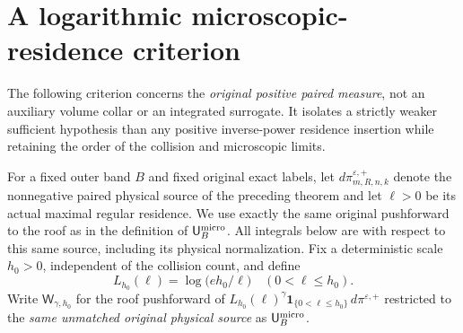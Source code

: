 \section{A logarithmic microscopic-residence criterion}
\label{sec:v106-logarithmic}
The following criterion concerns the \emph{original positive paired measure},
not an auxiliary volume collar or an integrated surrogate. It isolates a
strictly weaker sufficient hypothesis than any positive inverse-power
residence insertion while retaining the order of the collision and
microscopic limits.

For a fixed outer band $B$ and fixed original exact labels, let
$d\pi_{m,R,n,k}^{\varepsilon,+}$ denote the nonnegative paired
physical source of the preceding theorem and let $\ell>0$ be its
actual maximal regular residence. We use exactly the same original
pushforward to the roof as in the definition of
$\mathsf U_B^{\rm micro}$. All integrals below are with respect to this
same source, including its physical normalization. Fix a deterministic
scale $h_0>0$, independent of the collision count, and define
\[
  L_{h_0}(\ell)=\log\!\bigl(eh_0/\ell\bigr)
       \quad(0<\ell\le h_0).
\]
Write $\mathsf W_{\gamma,h_0}$ for the roof pushforward of
$L_{h_0}(\ell)^\gamma\mathbf1_{\{0<\ell\le h_0\}}\,d\pi^{\varepsilon,+}$
restricted to the \emph{same unmatched original physical source}
as $\mathsf U_B^{\rm micro}$.

